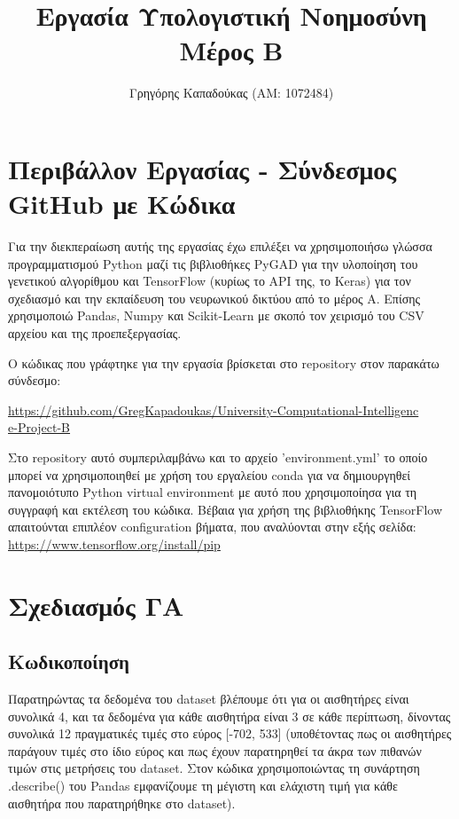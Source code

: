 \documentclass[12pt,a4paper]{article}
\title{Εργασία Υπολογιστική Νοημοσύνη\\Μέρος Β}
\author{Γρηγόρης Καπαδούκας (ΑΜ: 1072484)}
\begin{document}
\maketitle

\setcounter{section}{-1}
\section{Περιβάλλον Εργασίας - Σύνδεσμος GitHub με Κώδικα}
Για την διεκπεραίωση αυτής της εργασίας έχω επιλέξει να χρησιμοποιήσω γλώσσα προγραμματισμού Python μαζί τις βιβλιοθήκες PyGAD για την υλοποίηση του γενετικού αλγορίθμου και TensorFlow (κυρίως το API της, το Keras) για τον σχεδιασμό και την εκπαίδευση του νευρωνικού δικτύου από το μέρος Α. Επίσης χρησιμοποιώ Pandas, Numpy και Scikit-Learn με σκοπό τον χειρισμό του CSV αρχείου και της προεπεξεργασίας.

Ο κώδικας που γράφτηκε για την εργασία βρίσκεται στο repository στον παρακάτω σύνδεσμο:

\textcolor{blue}{\href{https://github.com/GregKapadoukas/University-Computational-Intelligence-Project-B}{https://github.com/GregKapadoukas/University-Computational-Intelligenc\\e-Project-B}}

Στο repository αυτό συμπεριλαμβάνω και το αρχείο 'environment.yml' το οποίο μπορεί να χρησιμοποιηθεί με χρήση του εργαλείου conda για να δημιουργηθεί πανομοιότυπο Python virtual environment με αυτό που χρησιμοποίησα για τη συγγραφή και εκτέλεση του κώδικα. Βέβαια για χρήση της βιβλιοθήκης TensorFlow απαιτούνται επιπλέον configuration βήματα, που αναλύονται στην εξής σελίδα:
\textcolor{blue}{\href{https://www.tensorflow.org/install/pip}{https://www.tensorflow.org/install/pip}}

\section{Σχεδιασμός ΓΑ}

\subsection{Κωδικοποίηση}

Παρατηρώντας τα δεδομένα του dataset βλέπουμε ότι για οι αισθητήρες είναι συνολικά 4, και τα δεδομένα για κάθε αισθητήρα είναι 3 σε κάθε περίπτωση, δίνοντας συνολικά 12 πραγματικές τιμές στο εύρος [-702, 533] (υποθέτοντας πως οι αισθητήρες παράγουν τιμές στο ίδιο εύρος και πως έχουν παρατηρηθεί τα άκρα των πιθανών τιμών στις μετρήσεις του dataset. Στον κώδικα χρησιμοποιώντας τη συνάρτηση .describe() του Pandas εμφανίζουμε τη μέγιστη και ελάχιστη τιμή για κάθε αισθητήρα που παρατηρήθηκε στο dataset).
\end{document}
